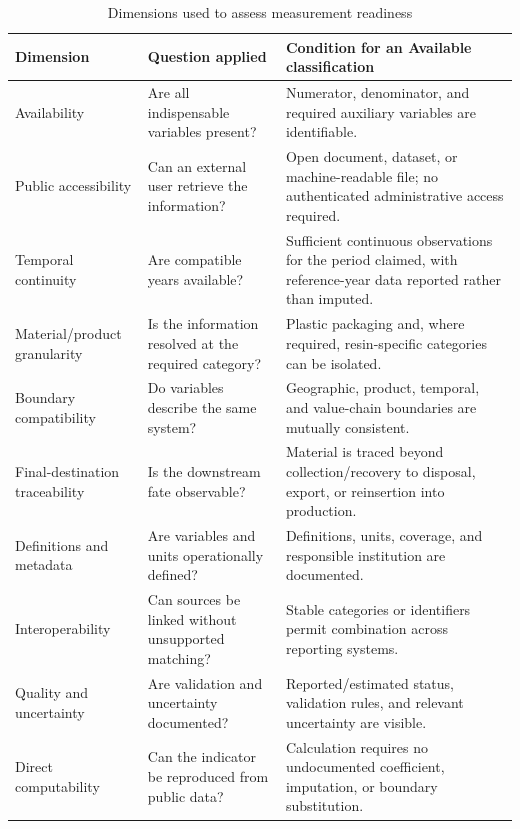 \documentclass[review,10pt]{elsarticle}
\begin{document}
\begin{longtable}{|L{3.1cm}|L{5.2cm}|L{6.7cm}|}
\caption{Dimensions used to assess measurement readiness}
\label{tab:s_readiness_dimensions}\\
\hline
\textbf{Dimension} & \textbf{Question applied} & \textbf{Condition for an Available classification} \\
\hline
\endfirsthead
\hline
Availability & Are all indispensable variables present? & Numerator, denominator, and required auxiliary variables are identifiable. \\
\hline
Public accessibility & Can an external user retrieve the information? & Open document, dataset, or machine-readable file; no authenticated administrative access required. \\
\hline
Temporal continuity & Are compatible years available? & Sufficient continuous observations for the period claimed, with reference-year data reported rather than imputed. \\
\hline
Material/product granularity & Is the information resolved at the required category? & Plastic packaging and, where required, resin-specific categories can be isolated. \\
\hline
Boundary compatibility & Do variables describe the same system? & Geographic, product, temporal, and value-chain boundaries are mutually consistent. \\
\hline
Final-destination traceability & Is the downstream fate observable? & Material is traced beyond collection/recovery to disposal, export, or reinsertion into production. \\
\hline
Definitions and metadata & Are variables and units operationally defined? & Definitions, units, coverage, and responsible institution are documented. \\
\hline
Interoperability & Can sources be linked without unsupported matching? & Stable categories or identifiers permit combination across reporting systems. \\
\hline
Quality and uncertainty & Are validation and uncertainty documented? & Reported/estimated status, validation rules, and relevant uncertainty are visible. \\
\hline
Direct computability & Can the indicator be reproduced from public data? & Calculation requires no undocumented coefficient, imputation, or boundary substitution. \\
\hline
\end{longtable}
\end{document}
